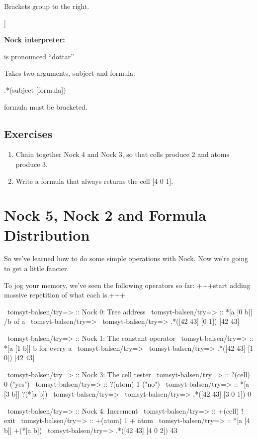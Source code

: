 Brackets group to the right.
\begin{code}
[a b c]         [a [b c]]
\end{code}

\textbf{Nock interpreter:}

 is pronounced ``dottar''

Takes two arguments, subject and formula:
\begin{code}
.*(subject [formula])
\end{code}
formula must be bracketed.

\subsection{Exercises}

\begin{enumerate}
\item Chain together Nock 4 and Nock 3, so that cells produce 2 and atoms produce 3.
\item Write a formula that always returns the cell [4 0 1].
\end{enumerate}

\section{Nock 5, Nock 2 and Formula Distribution}

\label{sec:nock_5_nock_2}

So we've learned how to do some simple operations with Nock. Now we're going to get a little fancier.

To jog your memory, we've seen the following operators so far: +++start adding massive repetition of what each  is.+++

\begin{codelisting}
\label{code:nock_review}
\begin{code}
~tomsyt-balsen/try=> :: Nock 0: Tree address
~tomsyt-balsen/try=> :: *[a [0 b]]               /b of a
~tomsyt-balsen/try=>
~tomsyt-balsen/try=>   .*([42 43] [0 1])
[42 43]

~tomsyt-balsen/try=> :: Nock 1: The constant operator
~tomsyt-balsen/try=> :: *[a [1 b]]               b for every a
~tomsyt-balsen/try=>
~tomsyt-balsen/try=>   .*([42 43] [1 0])
[42 43]

~tomsyt-balsen/try=> :: Nock 3: The cell tester
~tomsyt-balsen/try=> :: ?(cell)            0 ("yes")
~tomsyt-balsen/try=> :: ?(atom)            1 ("no")
~tomsyt-balsen/try=> :: *[a [3 b]]         ?(*[a b])
~tomsyt-balsen/try=>
~tomsyt-balsen/try=>   .*([42 43] [3 0 1])
0

~tomsyt-balsen/try=> :: Nock 4: Increment
~tomsyt-balsen/try=> :: +(cell)            ! exit
~tomsyt-balsen/try=> :: +(atom)            1 + atom
~tomsyt-balsen/try=> :: *[a [4 b]]         +(*[a b])
~tomsyt-balsen/try=>   .*([42 43] [4 0 2])
43
\end{code}
\end{codelisting}

